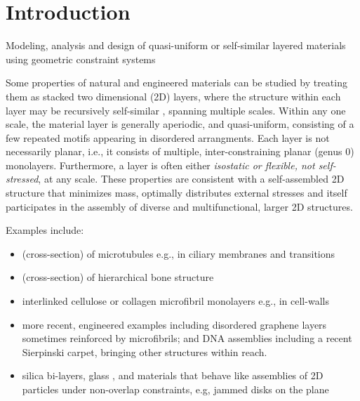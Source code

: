 \section{Introduction}
\label{sec:prev}
Modeling, analysis and design of quasi-uniform or self-similar layered materials using geometric constraint systems
 
Some properties of natural and engineered materials can be studied by treating them as stacked two dimensional (2D) layers, 
where the structure within each layer may be recursively 
self-similar \cite{Intro1}, 
spanning multiple scales. Within any one scale, the material layer is generally aperiodic, and quasi-uniform,
consisting of a few repeated motifs appearing in disordered arrangments.
Each layer is not necessarily planar, i.e., it consists of multiple, inter-constraining planar (genus 0) monolayers. 
Furthermore, a layer is often  either {\sl isostatic or flexible, not self-stressed}, at any scale. These properties are
consistent with a self-assembled 2D structure that minimizes mass, optimally distributes external stresses and itself 
participates in the assembly of diverse and multifunctional, 
larger 2D structures.

Examples include:

\begin{itemize}
    
    \item (cross-section) of microtubules \cite{Necklace1} e.g., in ciliary membranes and transitions \cite{Necklace2}
    
    \item (cross-section) of hierarchical bone structure \cite{XX}
    
    \item interlinked cellulose or collagen microfibril monolayers e.g., in cell-walls \cite{CellWalls1} \cite{CellWalls1}
    
    \item more recent, engineered examples including  disordered graphene layers \cite{Graphene1} \cite{Graphene2} sometimes reinforced 
    by  microfibrils; and DNA assemblies \cite{Microfibrils1} including a recent Sierpinski carpet, bringing other structures 
    \cite{Microfibrils2} within reach.
    
    \item  silica bi-layers, glass \cite{SilicaGlass1} \cite{SilicaGlass2}, and materials that behave like assemblies of 
    2D particles under non-overlap constraints, e.g, jammed 
    disks on the plane \cite{JammedDisk1}

   
\end{itemize}

